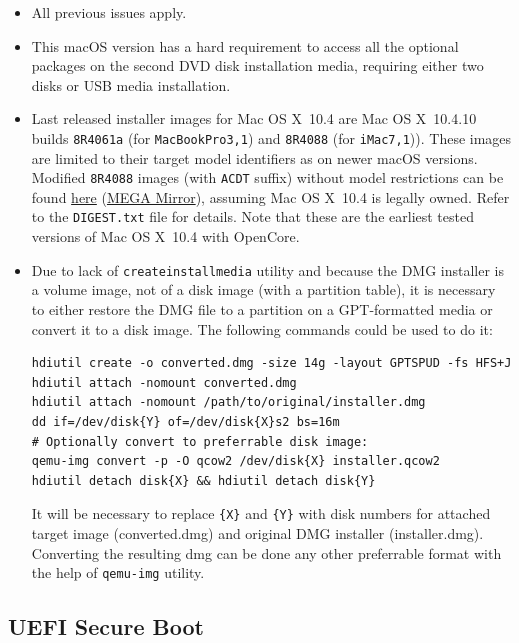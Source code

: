 \documentclass[]{article}
\begin{document}
\begin{itemize}
  \item All previous issues apply.
  \item This macOS version has a hard requirement to access all the optional
    packages on the second DVD disk installation media, requiring either two
    disks or USB media installation.
  \item Last released installer images for Mac OS X~10.4 are Mac OS X~10.4.10
    builds \texttt{8R4061a} (for \texttt{MacBookPro3,1}) and
    \texttt{8R4088} (for \texttt{iMac7,1})). These images are limited
    to their target model identifiers as on newer macOS versions.
    Modified \texttt{8R4088} images (with \texttt{ACDT} suffix) without
    model restrictions can be found
    \href{https://archive.org/details/10.4.10-8-r-4088-acdt}{here}
    (\href{https://mega.nz/folder/D3ASzLzA\#7sjYXE2X09f6aGjol\_C7dg}{MEGA Mirror}),
    assuming Mac OS X~10.4 is legally owned. Refer to the \texttt{DIGEST.txt} file
    for details. Note that these are the earliest tested
    versions of Mac OS X~10.4 with OpenCore.
  \item Due to lack of \texttt{createinstallmedia} utility and because the DMG installer
    is a volume image, not of a disk image (with a partition table), it is necessary
    to either restore the DMG file to a partition on a GPT-formatted media or convert
    it to a disk image. The following commands could be used to do it:

\begin{lstlisting}[label=convertdmg, style=ocbash]
hdiutil create -o converted.dmg -size 14g -layout GPTSPUD -fs HFS+J
hdiutil attach -nomount converted.dmg
hdiutil attach -nomount /path/to/original/installer.dmg
dd if=/dev/disk{Y} of=/dev/disk{X}s2 bs=16m
# Optionally convert to preferrable disk image:
qemu-img convert -p -O qcow2 /dev/disk{X} installer.qcow2
hdiutil detach disk{X} && hdiutil detach disk{Y}
\end{lstlisting}

    It will be necessary to replace \texttt{\{X\}} and \texttt{\{Y\}} with disk
    numbers for attached target image (converted.dmg) and original DMG installer
    (installer.dmg). Converting the resulting dmg can be done any other preferrable
    format with the help of \texttt{qemu-img} utility.
\end{itemize}

\subsection{UEFI Secure Boot}\label{uefisecureboot}
\end{document}
